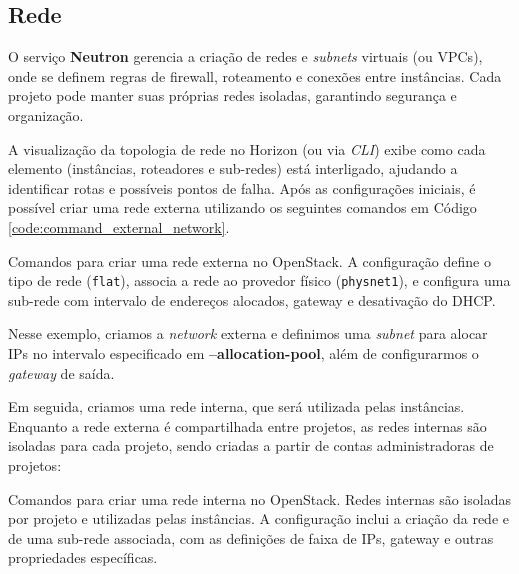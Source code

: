 \subsection{Rede}
O serviço \textbf{Neutron} gerencia a criação de redes e \textit{subnets} virtuais (ou VPCs), onde se definem regras de firewall, roteamento e conexões entre instâncias. Cada projeto pode manter suas próprias redes isoladas, garantindo segurança e organização.

A visualização da topologia de rede no Horizon (ou via \textit{CLI}) exibe como cada elemento (instâncias, roteadores e sub-redes) está interligado, ajudando a identificar rotas e possíveis pontos de falha. Após as configurações iniciais, é possível criar uma rede externa utilizando os seguintes comandos em Código \ref{code:command_external_network}.

\begin{listing}[h!]
    \noindent{}  
  \caption{Comandos para criar uma rede externa no OpenStack. A configuração define o tipo de rede (\texttt{flat}), associa a rede ao provedor físico (\texttt{physnet1}), e configura uma sub-rede com intervalo de endereços alocados, gateway e desativação do DHCP.}
  \label{code:command_external_network}
\end{listing}

Nesse exemplo, criamos a \textit{network} externa e definimos uma \textit{subnet} para alocar IPs no intervalo especificado em \textbf{--allocation-pool}, além de configurarmos o \textit{gateway} de saída.

Em seguida, criamos uma rede interna, que será utilizada pelas instâncias. Enquanto a rede externa é compartilhada entre projetos, as redes internas são isoladas para cada projeto, sendo criadas a partir de contas administradoras de projetos:

\begin{listing}[h!]
    \noindent{}  
  \caption{Comandos para criar uma rede interna no OpenStack. Redes internas são isoladas por projeto e utilizadas pelas instâncias. A configuração inclui a criação da rede e de uma sub-rede associada, com as definições de faixa de IPs, gateway e outras propriedades específicas.}
  \label{code:command_internal_network}
\end{listing}

